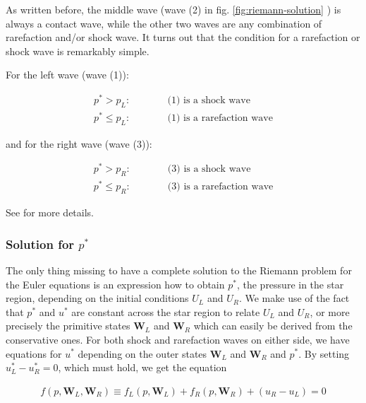 As written before, the middle wave (wave (2) in fig. \ref{fig:riemann-solution} ) is always a contact wave, while the other two waves are any combination of rarefaction and/or shock wave.
It turns out that the condition for a rarefaction or shock wave is remarkably simple.

For the left wave (wave (1)):

\begin{align}
	p^* > p_L: && &\quad \text{ (1) is a shock wave}\\
	p^* \leq p_L: && &\quad \text{ (1) is a rarefaction wave}
\end{align}

and for the right wave (wave (3)):

\begin{align}
	p^* > p_R: && & \quad \text{ (3) is a shock wave} \\
	p^* \leq p_R: && & \quad \text{ (3) is a rarefaction wave} 
\end{align}

See \cite{toro} for more details.










\subsubsection{Solution for $p^*$}

The only thing missing to have a complete solution to the Riemann problem for the Euler equations is an expression how to obtain $p^*$, the pressure in the star region, depending on the initial conditions $U_L$ and $U_R$.
We make use of the fact that $p^*$ and $u^*$ are constant across the star region to relate $U_L$ and $U_R$, or more precisely the primitive states $\mathbf{W}_L$ and $\mathbf{W}_R$ which can easily be derived from the conservative ones.
For both shock and rarefaction waves on either side, we have equations for $u^*$ depending on the outer states  $\mathbf{W}_L$ and $\mathbf{W}_R$ and $p^*$.
By setting $u^*_L - u^*_R = 0$, which must hold, we get the equation

\begin{align}
	f(p, \mathbf{W}_L, \mathbf{W}_R) \equiv f_L(p, \mathbf{W}_L) + f_R(p, \mathbf{W}_R) + (u_R - u_L) = 0 \label{eq:riemann-pressure-equation}
\end{align}

